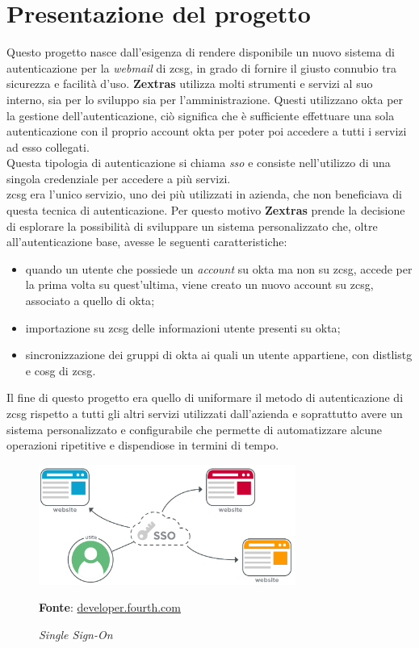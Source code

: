 \newpage

\section{Presentazione del progetto}\label{sec:progetto}
    Questo progetto nasce dall'esigenza di rendere disponibile un nuovo sistema di autenticazione per la \textit{webmail} di \gls{zcsg}, in grado di fornire il giusto connubio tra sicurezza e facilità d'uso. \textbf{Zextras} utilizza molti strumenti e servizi al suo interno, sia per lo sviluppo sia per l'amministrazione. Questi utilizzano \gls{okta} per la gestione dell'autenticazione, ciò significa che è sufficiente effettuare una sola autenticazione con il proprio account \gls{okta} per poter poi accedere a tutti i servizi ad esso collegati. \\
    Questa tipologia di autenticazione si chiama \textit{\gls{sso}} e consiste nell'utilizzo di una singola credenziale per accedere a più servizi. \\
    \gls{zcsg} era l'unico servizio, uno dei più utilizzati in azienda, che non beneficiava di questa tecnica di autenticazione. Per questo motivo \textbf{Zextras} prende la decisione di esplorare la possibilità di sviluppare un sistema personalizzato che, oltre all'autenticazione base, avesse le seguenti caratteristiche:
    \begin{itemize}
        \item quando un utente che possiede un \textit{account} su \gls{okta} ma non su \gls{zcsg}, accede per la prima volta su quest'ultima, viene creato un nuovo account su \gls{zcsg}, associato a quello di \gls{okta};
        \item importazione su \gls{zcsg} delle informazioni utente presenti su \gls{okta};
        \item sincronizzazione dei gruppi di \gls{okta} ai quali un utente appartiene, con \gls{distlistg} e \gls{cosg} di \gls{zcsg}.
    \end{itemize}
    Il fine di questo progetto era quello di uniformare il metodo di autenticazione di \gls{zcsg} rispetto a tutti gli altri servizi utilizzati dall'azienda e soprattutto avere un sistema personalizzato e configurabile che permette di automatizzare alcune operazioni ripetitive e dispendiose in termini di tempo.
    
    \begin{figure}[ht]
        \centering
        \includegraphics[width=0.75\textwidth]{immagini/sso.png}
        \caption{\textit{Single Sign-On}}
        \textbf{Fonte}:
        \href{https://developer.fourth.com/en-gb/docs/single-sign-saml}{developer.fourth.com}
        \label{fig: Single Sign-On}
    \end{figure}

